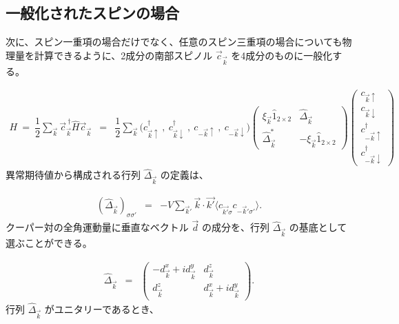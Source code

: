 \documentclass[uplatex,a4j,12pt,dvipdfmx]{jsarticle}
\begin{document}
\subsection{一般化されたスピンの場合}

次に、スピン一重項の場合だけでなく、任意のスピン三重項の場合についても物理量を計算できるように、2成分の南部スピノル $\vec{c}_{\vec{k}}$ を4成分のものに一般化する。

\begin{eqnarray}
	H
	\ = \
	\dfrac{1}{2}
	\sum_{\vec{k}}
	\vec{c}^{\ \dagger}_{\vec{k}}
	\hat{H}
	\vec{c}_{\vec{k}}
	&=&
	\dfrac{1}{2}
	\sum_{\vec{k}}
	\big( c^{\dagger}_{\vec{k} \uparrow} \ , \ c^{\dagger}_{\vec{k} \downarrow} \ , \ c_{-\vec{k} \uparrow} \ , \ c_{-\vec{k} \downarrow}  \big)
	\!\!\!
	\left(
	\begin{array}{cc}
			\xi_{\vec{k}} \hat{1}_{2 \times 2} & \hat{\Delta}_{\vec{k}}               \\[3mm]
			\hat{\Delta}^{*}_{\vec{k}}         & - \xi_{\vec{k}} \hat{1}_{2 \times 2}
		\end{array}
	\right)
	\!\!\!
	\left(
	\begin{array}{c}
			c_{\vec{k} \uparrow}            \\[2mm]
			c_{\vec{k} \downarrow}          \\[2mm]
			c^{\dagger}_{-\vec{k} \uparrow} \\[2mm]
			c^{\dagger}_{-\vec{k} \downarrow}
		\end{array}
	\right)
\end{eqnarray}
%
異常期待値から構成される行列 $\hat{\Delta}_{\vec{k}}$ の定義は、

\begin{eqnarray}
	(\hat{\Delta}_{\vec{k}})_{\sigma\sigma'}
	&=&
	-V \sum_{\vec{k}'} \vec{k} \cdot \vec{k'}
	\big\langle c_{\vec{k'} \sigma} c_{-\vec{k}' \sigma'} \big\rangle
	.
\end{eqnarray}
%
クーパー対の全角運動量に垂直なベクトル $\vec{d}$ の成分を、行列 $\hat{\Delta}_{\vec{k}}$ の基底として選ぶことができる。

\begin{eqnarray}
	\hat{\Delta}_{\vec{k}}
	&=&
	\left(
	\begin{array}{cc}
			- d^{x}_{\vec{k}} + i d^{y}_{\vec{k}} & d^{z}_{\vec{k}}                     \\[2mm]
			d^{z}_{\vec{k}}                       & d^{x}_{\vec{k}} + i d^{y}_{\vec{k}}
		\end{array}
	\right)
	.
\end{eqnarray}
%
行列 $\hat{\Delta}_{\vec{k}}$ がユニタリーであるとき、
\end{document}
